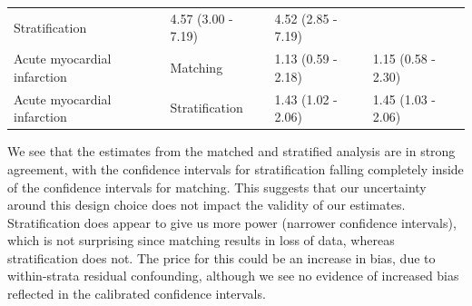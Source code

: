 \documentclass[11pt]{book}
\begin{document}
\begin{longtable}[]{@{}llll@{}}
\begin{minipage}[t]{0.15\columnwidth}
Stratification\strut
\end{minipage} & \begin{minipage}[t]{0.17\columnwidth}\raggedright\strut
4.57 (3.00 - 7.19)\strut
\end{minipage} & \begin{minipage}[t]{0.17\columnwidth}\raggedright\strut
4.52 (2.85 - 7.19)\strut
\end{minipage}\tabularnewline
\begin{minipage}[t]{0.27\columnwidth}\raggedright\strut
Acute myocardial infarction\strut
\end{minipage} & \begin{minipage}[t]{0.15\columnwidth}\raggedright\strut
Matching\strut
\end{minipage} & \begin{minipage}[t]{0.17\columnwidth}\raggedright\strut
1.13 (0.59 - 2.18)\strut
\end{minipage} & \begin{minipage}[t]{0.17\columnwidth}\raggedright\strut
1.15 (0.58 - 2.30)\strut
\end{minipage}\tabularnewline
\begin{minipage}[t]{0.27\columnwidth}\raggedright\strut
Acute myocardial infarction\strut
\end{minipage} & \begin{minipage}[t]{0.15\columnwidth}\raggedright\strut
Stratification\strut
\end{minipage} & \begin{minipage}[t]{0.17\columnwidth}\raggedright\strut
1.43 (1.02 - 2.06)\strut
\end{minipage} & \begin{minipage}[t]{0.17\columnwidth}\raggedright\strut
1.45 (1.03 - 2.06)\strut
\end{minipage}\tabularnewline
\bottomrule
\end{longtable}

We see that the estimates from the matched and stratified analysis are
in strong agreement, with the confidence intervals for stratification
falling completely inside of the confidence intervals for matching. This
suggests that our uncertainty around this design choice does not impact
the validity of our estimates. Stratification does appear to give us
more power (narrower confidence intervals), which is not surprising
since matching results in loss of data, whereas stratification does not.
The price for this could be an increase in bias, due to within-strata
residual confounding, although we see no evidence of increased bias
reflected in the calibrated confidence intervals.
\end{document}
